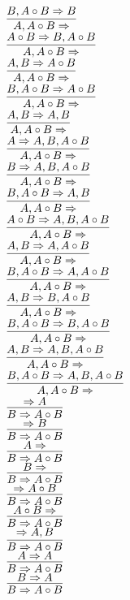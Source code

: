 \documentclass[11pt]{article}
\begin{document}
\begin{center}
\bigskip
\\$\infer{A, A\circ B\Rightarrow }{B, A\circ B\Rightarrow B}$
\bigskip
\\$\infer{A, A\circ B\Rightarrow }{A\circ B\Rightarrow B, A\circ B}$
\bigskip
\\$\infer{A, A\circ B\Rightarrow }{A, B\Rightarrow A\circ B}$
\bigskip
\\$\infer{A, A\circ B\Rightarrow }{B, A\circ B\Rightarrow A\circ B}$
\bigskip
\\$\infer{A, A\circ B\Rightarrow }{A, B\Rightarrow A, B}$
\bigskip
\\$\infer{A, A\circ B\Rightarrow }{A\Rightarrow A, B, A\circ B}$
\bigskip
\\$\infer{A, A\circ B\Rightarrow }{B\Rightarrow A, B, A\circ B}$
\bigskip
\\$\infer{A, A\circ B\Rightarrow }{B, A\circ B\Rightarrow A, B}$
\bigskip
\\$\infer{A, A\circ B\Rightarrow }{A\circ B\Rightarrow A, B, A\circ B}$
\bigskip
\\$\infer{A, A\circ B\Rightarrow }{A, B\Rightarrow A, A\circ B}$
\bigskip
\\$\infer{A, A\circ B\Rightarrow }{B, A\circ B\Rightarrow A, A\circ B}$
\bigskip
\\$\infer{A, A\circ B\Rightarrow }{A, B\Rightarrow B, A\circ B}$
\bigskip
\\$\infer{A, A\circ B\Rightarrow }{B, A\circ B\Rightarrow B, A\circ B}$
\bigskip
\\$\infer{A, A\circ B\Rightarrow }{A, B\Rightarrow A, B, A\circ B}$
\bigskip
\\$\infer{A, A\circ B\Rightarrow }{B, A\circ B\Rightarrow A, B, A\circ B}$
\bigskip
\\$\infer{B\Rightarrow A\circ B}{\Rightarrow A}$
\bigskip
\\$\infer{B\Rightarrow A\circ B}{\Rightarrow B}$
\bigskip
\\$\infer{B\Rightarrow A\circ B}{A\Rightarrow }$
\bigskip
\\$\infer{B\Rightarrow A\circ B}{B\Rightarrow }$
\bigskip
\\$\infer{B\Rightarrow A\circ B}{\Rightarrow A\circ B}$
\bigskip
\\$\infer{B\Rightarrow A\circ B}{A\circ B\Rightarrow }$
\bigskip
\\$\infer{B\Rightarrow A\circ B}{\Rightarrow A, B}$
\bigskip
\\$\infer{B\Rightarrow A\circ B}{A\Rightarrow A}$
\bigskip
\\$\infer{B\Rightarrow A\circ B}{B\Rightarrow A}$

\end{center}
\end{document}
